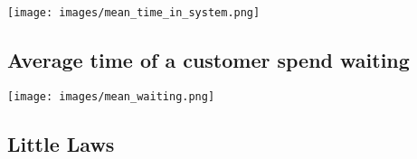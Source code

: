 \noindent
\begin{minipage}{\textwidth}
    \texttt{[image: images/mean\_time\_in\_system.png]}
    \label{bar}
\end{minipage}
\subsection{Average time of a customer spend waiting}
\noindent
\begin{minipage}{\textwidth}
    \texttt{[image: images/mean\_waiting.png]}
    \label{bar}
\end{minipage}
\subsection{Little Laws}
